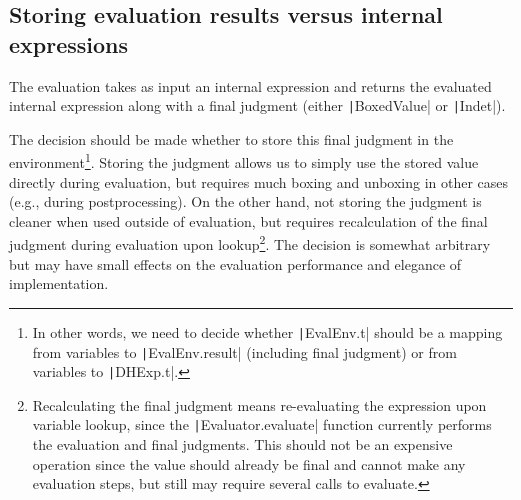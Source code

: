 \subsection{Storing evaluation results versus internal expressions}
\label{sec:result-vs-dhexp}

The evaluation takes as input an internal expression and returns the evaluated internal expression along with a \textsf{final} judgment (either \texttt|BoxedValue| or \texttt|Indet|).

The decision should be made whether to store this \textsf{final} judgment in the environment\footnote{In other words, we need to decide whether \texttt|EvalEnv.t| should be a mapping from variables to \texttt|EvalEnv.result| (including \textsf{final} judgment) or from variables to \texttt|DHExp.t|.}. Storing the judgment allows us to simply use the stored value directly during evaluation, but requires much boxing and unboxing in other cases (e.g., during postprocessing). On the other hand, not storing the judgment is cleaner when used outside of evaluation, but requires recalculation of the \textsf{final} judgment during evaluation upon lookup\footnote{Recalculating the \textsf{final} judgment means re-evaluating the expression upon variable lookup, since the \texttt|Evaluator.evaluate| function currently performs the evaluation and \textsf{final} judgments. This should not be an expensive operation since the value should already be final and cannot make any evaluation steps, but still may require several calls to evaluate.}. The decision is somewhat arbitrary but may have small effects on the evaluation performance and elegance of implementation.

